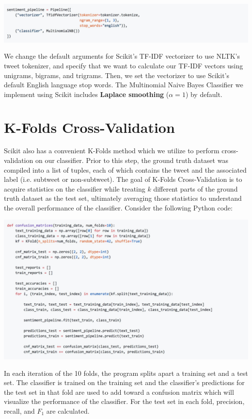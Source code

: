 \documentclass[11pt, twoside, reqno]{book}
\begin{document}
\vskip 0.2in
\includegraphics[width=\textwidth]{pipeline}

We change the default arguments for Scikit's TF-IDF vectorizer to use NLTK's tweet tokenizer, and specify that we want to calculate our TF-IDF vectors using unigrams, bigrams, and trigrams. Then, we set the vectorizer to use Scikit's default English language stop words. The Multinomial Naive Bayes Classifier we implement using Scikit includes \textbf{Laplace smoothing} ($\alpha=1$) by default.

\section{K-Folds Cross-Validation}
\label{k_folds_code}

Scikit also has a convenient K-Folds method which we utilize to perform cross-validation on our classifier. Prior to this step, the ground truth dataset was compiled into a list of tuples, each of which contains the tweet and the associated label (i.e. subtweet or non-subtweet). The goal of K-Folds Cross-Validation is to acquire statistics on the classifier while treating $k$ different parts of the ground truth dataset as the test set, ultimately averaging those statistics to understand the overall performance of the classifier. Consider the following Python code:

\vskip 0.2in
\includegraphics[width=\textwidth]{k_folds_code}

In each iteration of the 10 folds, the program splits apart a training set and a test set. The classifier is trained on the training set and the classifier's predictions for the test set in that fold are used to add toward a confusion matrix which will visualize the performance of the classifier. For the test set in each fold, precision, recall, and $F_{1}$ are calculated.
\end{document}
